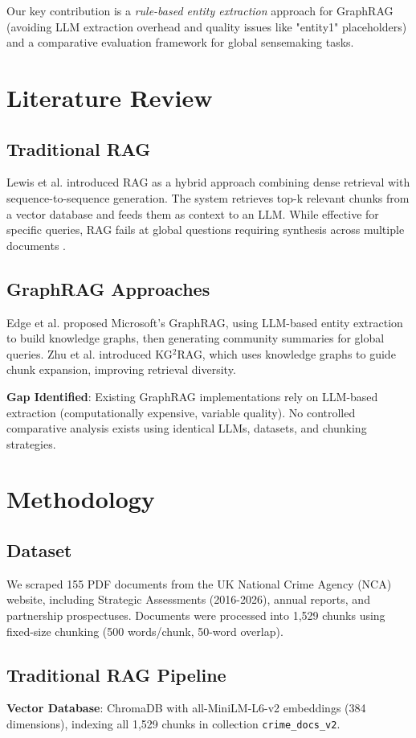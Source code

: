 \documentclass[conference]{IEEEtran}
\begin{document}
Our key contribution is a \textit{rule-based entity extraction} approach for GraphRAG (avoiding LLM extraction overhead and quality issues like "entity1" placeholders) and a comparative evaluation framework for global sensemaking tasks.

\section{Literature Review}
\subsection{Traditional RAG}
Lewis et al. \cite{lewis2020retrieval} introduced RAG as a hybrid approach combining dense retrieval with sequence-to-sequence generation. The system retrieves top-k relevant chunks from a vector database and feeds them as context to an LLM. While effective for specific queries, RAG fails at global questions requiring synthesis across multiple documents \cite{edge2024graphrag}.

\subsection{GraphRAG Approaches}
Edge et al. \cite{edge2024graphrag} proposed Microsoft's GraphRAG, using LLM-based entity extraction to build knowledge graphs, then generating community summaries for global queries. Zhu et al. \cite{zhu2025knowledge} introduced KG$^2$RAG, which uses knowledge graphs to guide chunk expansion, improving retrieval diversity.

\textbf{Gap Identified}: Existing GraphRAG implementations rely on LLM-based extraction (computationally expensive, variable quality). No controlled comparative analysis exists using identical LLMs, datasets, and chunking strategies.

\section{Methodology}
\subsection{Dataset}
We scraped 155 PDF documents from the UK National Crime Agency (NCA) website, including Strategic Assessments (2016-2026), annual reports, and partnership prospectuses. Documents were processed into 1,529 chunks using fixed-size chunking (500 words/chunk, 50-word overlap).

\subsection{Traditional RAG Pipeline}
\textbf{Vector Database}: ChromaDB with all-MiniLM-L6-v2 embeddings (384 dimensions), indexing all 1,529 chunks in collection \texttt{crime\_docs\_v2}.
\end{document}

